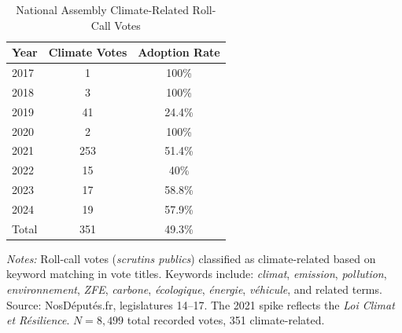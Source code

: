 \begin{table}[H]
\centering
\caption{National Assembly Climate-Related Roll-Call Votes}
\label{tab:climate_votes}
\begin{threeparttable}
\begin{tabular}{lcc}
\toprule
Year & Climate Votes & Adoption Rate \\
\midrule
2017 & 1 & 100\% \\
2018 & 3 & 100\% \\
2019 & 41 & 24.4\% \\
2020 & 2 & 100\% \\
2021 & 253 & 51.4\% \\
2022 & 15 & 40\% \\
2023 & 17 & 58.8\% \\
2024 & 19 & 57.9\% \\
\midrule
Total & 351 & 49.3\% \\
\bottomrule
\end{tabular}
\begin{tablenotes}[flushleft]
\small
\item \textit{Notes:} Roll-call votes (\textit{scrutins publics}) classified as climate-related based on keyword matching in vote titles. Keywords include: \textit{climat}, \textit{emission}, \textit{pollution}, \textit{environnement}, \textit{ZFE}, \textit{carbone}, \textit{\'ecologique}, \textit{\'energie}, \textit{v\'ehicule}, and related terms. Source: NosDéputés.fr, legislatures 14--17. The 2021 spike reflects the \textit{Loi Climat et R\'esilience}. $N = 8{,}499$ total recorded votes, 351 climate-related.
\end{tablenotes}
\end{threeparttable}
\end{table}
